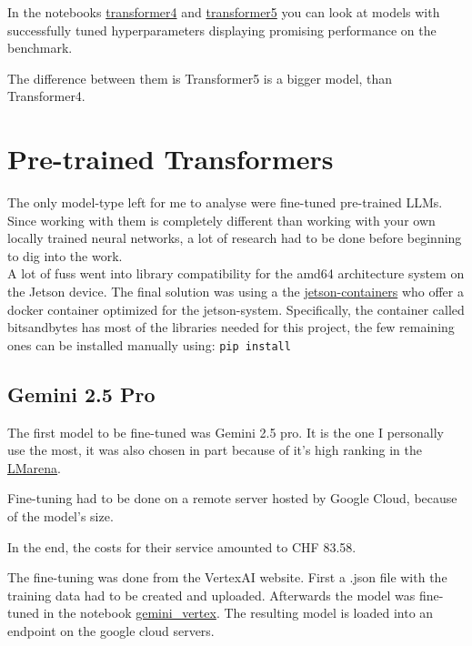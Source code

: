 \documentclass{article}
\begin{document}
In the notebooks \href{https://github.com/AntonStantan/matura/blob/main/transformer/transformer4.ipynb}
{transformer4} and \href{https://github.com/AntonStantan/matura/blob/main/transformer/transformer5.ipynb}
{transformer5} you can look at models with successfully tuned 
hyperparameters displaying promising performance on the benchmark.

The difference between them is Transformer5 is a bigger model, than 
Transformer4.

\section{Pre-trained Transformers}

The only model-type left for me to analyse were fine-tuned pre-trained LLMs.
Since working with them is completely different than working with your own 
locally trained neural networks, a lot of research had to be done before 
beginning to dig into the work.
\\[1em]
A lot of fuss went into library compatibility for the amd64 architecture 
system on the Jetson device. The final solution was using a the 
\href{https://github.com/dusty-nv/jetson-containers}{jetson-containers} 
who offer a docker container optimized for the jetson-system. Specifically, 
the container called bitsandbytes has most of the libraries needed for this 
project, the few remaining ones can be installed manually using: \texttt{pip install}


\subsection{Gemini 2.5 Pro}
The first model to be fine-tuned was Gemini 2.5 pro. It is the one I 
personally use the most, it was also chosen in part because of it's high 
ranking in the \href{https://lmarena.ai/leaderboard}{LMarena}. 

Fine-tuning had to be done on a remote server hosted by Google Cloud, 
because of the model's size. 

In the end, the costs for their service amounted to CHF 83.58.

The fine-tuning was done from the VertexAI website. First a .json file with 
the training data had to be created and uploaded. Afterwards the model was 
fine-tuned in the notebook \href{https://github.com/AntonStantan/matura/blob/main/pre-trained-tranformers/gemini_vertex.ipynb}
{gemini\_vertex}. The resulting model is loaded into an endpoint on the 
google cloud servers.
\end{document}
